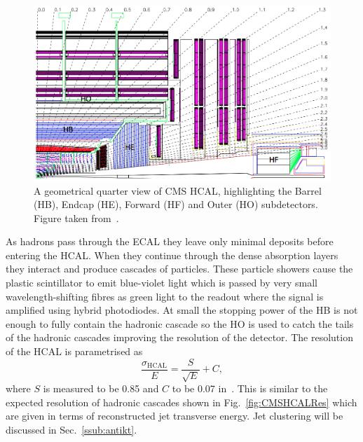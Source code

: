 \begin{figure}[htpb]
	\centering
	\includegraphics[width=\textwidth]{Figures/CMSHCAL}
	\caption[A geometrical quarter view of CMS HCAL, highlighting the Barrel (HB), Endcap (HE), Forward (HF) and Outer (HF) subdetectors.]{A geometrical quarter view of CMS HCAL, highlighting the Barrel (HB), Endcap (HE), Forward (HF) and Outer (HO) subdetectors. Figure taken from~\cite{CMSExperiment}.}
	\label{fig:CMSHCAL}
\end{figure}

As hadrons pass through the ECAL they leave only minimal deposits before entering the HCAL. 
When they continue through the dense absorption layers they interact and produce cascades of particles. 
These particle showers cause the plastic scintillator to emit blue-violet light which is passed by very small wavelength-shifting fibres as green light to the readout where the signal is amplified using hybrid photodiodes.
At small \abseta{} the stopping power of the HB is not enough to fully contain the hadronic cascade so the HO is used to catch the tails of the hadronic cascades improving the \ptmiss{} resolution of the detector.
The resolution of the HCAL is parametrised as 
\begin{equation} \label{eq:ECALRes}
	\frac{\sigma_{\mathrm{HCAL}}}{E} = \frac{S}{\sqrt{E}} + C,
\end{equation}
where $S$ is measured to be 0.85 and $C$ to be 0.07 in~\cite{CMS:HCALRES}.
This is similar to the expected resolution of hadronic cascades shown in Fig.~\ref{fig:CMSHCALRes} which are given in terms of reconstructed jet transverse energy.
Jet clustering will be discussed in Sec.~\ref{ssub:antikt}.

